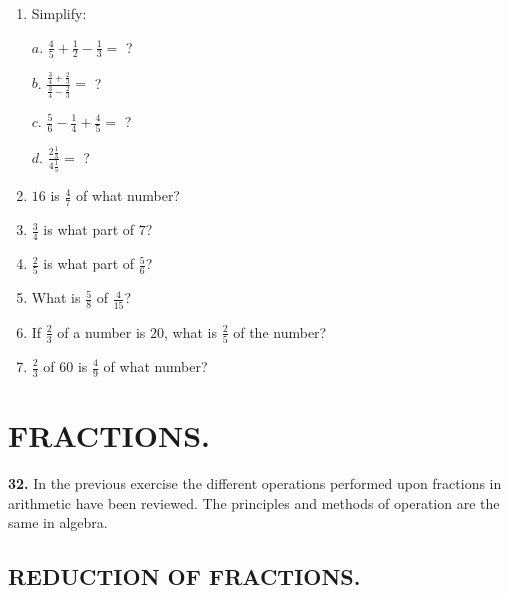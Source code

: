 \documentclass{book}
\begin{document}
\begin{enumerate}
$l$. $9$ by $\frac{5}{6}$.

$m$. $\frac{12}{25}$ by $\frac{9}{20}$.

$n$. $3 \frac{1}{2}$ by $1 \frac{3}{4}$.

$o$. $3 \frac{3}{5}$ by $2 \frac{2}{5}$.

$p$. $48$ by $3 \frac{1}{5}$.

$q$. $63$ by $4 \frac{2}{3}$.

$r$. $\frac{5}{6}$ by $\frac{3}{8}$.

\item Simplify:

$a$. $\frac{4}{5} + \frac{1}{2} - \frac{1}{3} =$ ?

$b$. $\frac{\frac{3}{4} + \frac{2}{3}}{\frac{3}{4} - \frac{2}{3}} =$ ?

$c$. $\frac{5}{6} - \frac{1}{4} + \frac{4}{5} =$ ?

$d$. $\frac{2 \frac{1}{3}}{4 \frac{1}{5}} =$ ?

\item $16$ is $\frac{4}{7}$ of what number?

\item $\frac{3}{4}$ is what part of $7$?

\item $\frac{2}{5}$ is what part of $\frac{5}{6}$?

\item What is $\frac{5}{8}$ of $\frac{4}{15}$?

\item If $\frac{2}{3}$ of a number is $20$, what is $\frac{2}{5}$
of the number?

\item $\frac{2}{3}$ of $60$ is $\frac{4}{9}$ of what number?
\end{enumerate}


\chapter*{FRACTIONS.}


\textbf{ 32.} In the previous exercise the different operations
performed upon fractions in arithmetic have been reviewed. The
principles and methods of operation are the same in algebra.

\section*{REDUCTION OF FRACTIONS.}
\end{document}
